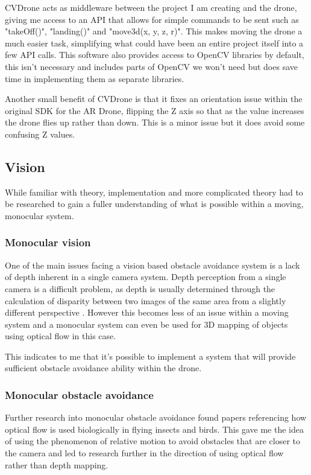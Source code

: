 CVDrone acts as middleware between the project I am creating and the drone, giving me access to an API that allows for simple commands to be sent such as "takeOff()", "landing()" and "move3d(x, y, z, r)". This makes moving the drone a much easier task, simplifying what could have been an entire project itself into a few API calls. This software also provides access to OpenCV libraries by default, this isn't necessary and includes parts of OpenCV we won't need but does save time in implementing them as separate libraries.

Another small benefit of CVDrone is that it fixes an orientation issue within the original SDK for the AR Drone, flipping the Z axis so that as the value increases the drone flies up rather than down. This is a minor issue but it does avoid some confusing Z values.

\subsection{Vision}
While familiar with theory, implementation and more complicated theory had to be researched to gain a fuller understanding of what is possible within a moving, monocular system.


\subsubsection{Monocular vision}
One of the main issues facing a vision based obstacle avoidance system is a lack of depth inherent in a single camera system. Depth perception from a single camera is a difficult problem, as depth is usually determined through the calculation of disparity between two images of the same area from a slightly different perspective \cite{StereoDepth}. However this becomes less of an issue within a moving system and a monocular system can even be used for 3D mapping of objects using optical flow\cite{3DMapOpFlowMono} in this case.

This indicates to me that it's possible to implement a system that will provide sufficient obstacle avoidance ability within the drone.

\subsubsection{Monocular obstacle avoidance}
Further research into monocular obstacle avoidance found papers referencing how optical flow is used biologically in flying insects\cite{citeulike:9515178} and birds\cite{opticalFlowBirds}. This gave me the idea of using the phenomenon of relative motion to avoid obstacles that are closer to the camera and led to research further in the direction of using optical flow rather than depth mapping.

